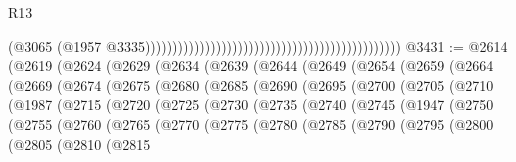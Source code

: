\begin{lexlean}{R13}
\begin{coremodule}
                                                                                              (@3065
                                                                                                (@1957
                                                                                                  @3335)))))))))))))))))))))))))))))))))))))))))))))))
@3431 := @2614
    (@2619
      (@2624
        (@2629
          (@2634
            (@2639
              (@2644
                (@2649
                  (@2654
                    (@2659
                      (@2664
                        (@2669
                          (@2674
                            (@2675
                              (@2680
                                (@2685
                                  (@2690
                                    (@2695
                                      (@2700
                                        (@2705
                                          (@2710
                                            (@1987
                                              (@2715
                                                (@2720
                                                  (@2725
                                                    (@2730
                                                      (@2735
                                                        (@2740
                                                          (@2745
                                                            (@1947
                                                              (@2750
                                                                (@2755
                                                                  (@2760
                                                                    (@2765
                                                                      (@2770
                                                                        (@2775
                                                                          (@2780
                                                                            (@2785
                                                                              (@2790
                                                                                (@2795
                                                                                  (@2800
                                                                                    (@2805
                                                                                      (@2810
                                                                                        (@2815

\end{coremodule}
\end{lexlean}
